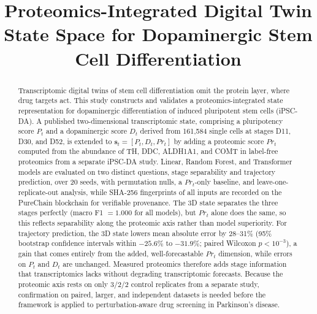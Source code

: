\documentclass[5p,times,twocolumn]{elsarticle}
\newcommand{\rtag}[1]{}
\begin{document}
\begin{frontmatter}

  \title{Proteomics-Integrated Digital Twin State Space for Dopaminergic Stem Cell Differentiation}


  \begin{abstract}
    \color{red}
    \rtag{R1.1,R2.1,R1.14}Transcriptomic digital twins of stem cell
    differentiation omit the protein layer, where drug targets act.
    This study constructs and validates a proteomics-integrated
    state representation for dopaminergic differentiation of induced
    pluripotent stem cells (iPSC-DA). A published two-dimensional
    transcriptomic state, comprising a pluripotency score $P_{t}$
    and a dopaminergic score $D_{t}$ derived from 161,584 single
    cells at stages D11, D30, and D52, is extended to
    $\mathbf{s}_{t} = [P_{t}, D_{t}, Pr_{t}]$ by adding a proteomic
    score $Pr_{t}$ computed from the abundance of TH, DDC, ALDH1A1,
    and COMT in label-free proteomics from a separate iPSC-DA study.
    Linear, Random Forest, and Transformer models are evaluated on
    two distinct questions, stage separability and trajectory
    prediction, over 20 seeds, with permutation nulls, a
    $Pr_{t}$-only baseline, and leave-one-replicate-out analysis,
    while SHA-256 fingerprints of all inputs are recorded on the
    PureChain blockchain for verifiable provenance.
    \rtag{R1.8,R2.12}The 3D state separates the three stages
    perfectly (macro F1 $= 1.000$ for all models), but $Pr_{t}$
    alone does the same, so this reflects separability along the
    proteomic axis rather than model superiority.
    \rtag{R1.4,R1.9,R2.13}For trajectory prediction, the 3D state
    lowers mean absolute error by 28--31\% (95\% bootstrap
    confidence intervals within $-25.6\%$ to $-31.9\%$; paired
    Wilcoxon $p < 10^{-3}$), a gain that comes entirely from the
    added, well-forecastable $Pr_{t}$ dimension, while errors on
    $P_{t}$ and $D_{t}$ are unchanged.
    \rtag{R1.5,R2.8,R2.20}Measured proteomics therefore adds stage
    information that transcriptomics lacks without degrading
    transcriptomic forecasts. Because the proteomic axis rests on
    only 3/2/2 control replicates from a separate study,
    confirmation on paired, larger, and independent datasets is
    needed before the framework is applied to perturbation-aware
    drug screening in Parkinson's disease.
  \end{abstract}


\end{frontmatter}
\end{document}
